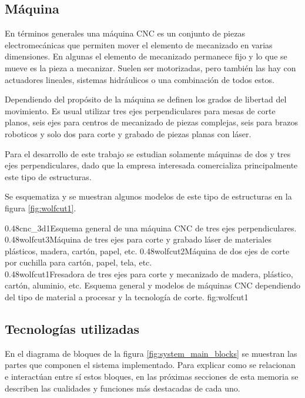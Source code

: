 \subsection{Máquina}
En términos generales una máquina CNC es un conjunto de piezas electromecánicas que permiten mover el elemento de mecanizado en varias dimensiones.
En algunas el elemento de mecanizado permanece fijo y lo que se mueve es la pieza a mecanizar.
Suelen ser motorizadas, pero también las hay con actuadores lineales, sistemas hidráulicos o una combinación de todos estos.\par
Dependiendo del propósito de la máquina se definen los grados de libertad del movimiento.
Es usual utilizar tres ejes perpendiculares para mesas de corte planos, seis ejes para centros de mecanizado de piezas complejas, seis para brazos roboticos y solo dos para corte y grabado de piezas planas con láser.\par
Para el desarrollo de este trabajo se estudian solamente máquinas de dos y tres ejes perpendiculares, dado que la empresa interesada comercializa principalmente este tipo de estructuras. \par
Se esquematiza y se muestran algunos modelos de este tipo de estructuras en la figura \ref{fig:wolfcut1}.

\subfigtwotwo
{0.48}{cnc_3d1}{Esquema general de una máquina CNC de tres ejes perpendiculares.\\ \vphantom{1}}
            {0.48}{wolfcut3}{Máquina de tres ejes para corte y grabado láser de materiales plásticos, madera, cartón, papel, etc.}
            {0.48}{wolfcut2}{Máquina de dos ejes de corte por cuchilla para cartón, papel, tela, etc.\\ \vphantom{1}}
            {0.48}{wolfcut1}{Fresadora de tres ejes para corte y mecanizado de madera, plástico, cartón, aluminio, etc.}
            {Esquema general y modelos de máquinas CNC dependiendo del tipo de material a procesar y la tecnología de corte.}
            {fig:wolfcut1}


\subsection{Tecnologías utilizadas}
   En el diagrama de bloques de la figura \ref{fig:system_main_blocks} se muestran las partes que componen el sistema implementado.
   Para explicar como se relacionan e interactúan entre sí estos bloques, en las próximas secciones de esta memoria se describen las cualidades y funciones más destacadas de cada uno.

